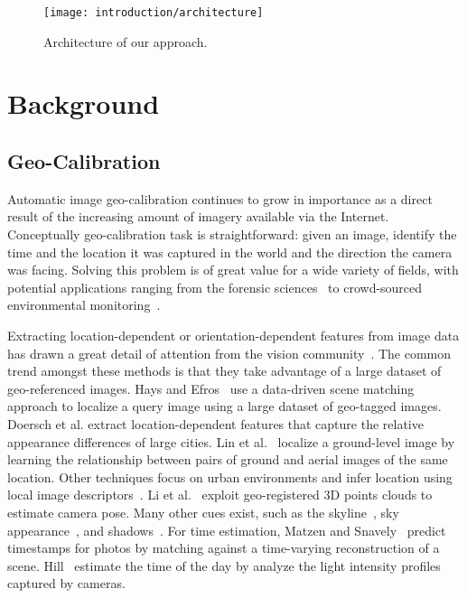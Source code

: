 \begin{figure}
  \centering
  \texttt{[image: introduction/architecture]}
  \caption{Architecture of our approach.}
  \label{fig:intro:architecture}
\end{figure}

\section{Background}

\subsection{Geo-Calibration}
%
Automatic image geo-calibration continues to grow in importance as a
direct result of the increasing amount of imagery available
via the Internet. Conceptually geo-calibration task is
straightforward: given an image, identify the time and the location it
was captured in the world and the direction the camera was facing.
Solving this problem is of great value for a wide variety of fields,
with potential applications ranging from the forensic
sciences~\cite{stylianou13jane} to crowd-sourced environmental
monitoring~\cite{zhang2012mining}.

Extracting location-dependent or orientation-dependent features from
image data has drawn a great detail of attention from the vision
community~\cite{jacobs07geolocate, jacobs11geolocate,
jacobs08geoorient}. The common trend amongst these methods is that
they take advantage of a large dataset of geo-referenced images. Hays
and Efros~\cite{hays2008im2gps} use a data-driven scene matching
approach to localize a query image using a large dataset of geo-tagged
images.  Doersch et al. extract location-dependent features that
capture the relative appearance differences of large cities.  Lin et
al.~\cite{lin2013cross} localize a ground-level image by learning the
relationship between pairs of ground and aerial images of the same
location. Other techniques focus on urban environments and infer
location using local image
descriptors~\cite{schindler2008detecting,snavely2006photo}. Li et
al.~\cite{li2012worldwide} exploit geo-registered 3D points clouds to
estimate camera pose. Many other cues exist, such as the
skyline~\cite{baatz2012large,ramalingam2009geolocalization}, sky
appearance~\cite{lalonde2010sun,workman2014rainbow}, and
shadows~\cite{junejo2008estimating,wu2010geo}.
For time estimation, Matzen and Snavely~\cite{matzen2014scene} predict
timestamps for photos by matching against a time-varying
reconstruction of a scene.  Hill~\cite{hill1994elephant} estimate the
time of the day by analyze the light intensity profiles captured by
cameras.


